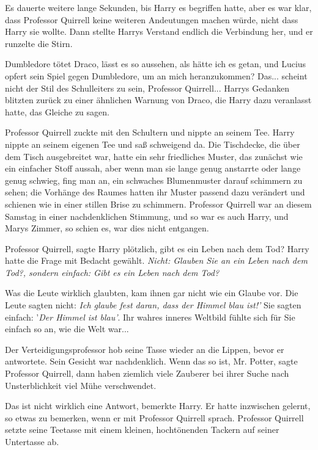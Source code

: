 Es dauerte weitere lange Sekunden, bis Harry es begriffen hatte, aber es war
klar, dass Professor Quirrell keine weiteren Andeutungen machen würde, nicht
dass Harry sie wollte. Dann stellte Harrys Verstand endlich die Verbindung her,
und er runzelte die Stirn.

\glqq{}Dumbledore tötet Draco, lässt es so aussehen, als hätte ich es getan, und
Lucius opfert sein Spiel gegen Dumbledore, um an mich heranzukommen? Das...
scheint nicht der Stil des Schulleiters zu sein, Professor Quirrell...\grqq{}
Harrys Gedanken blitzten zurück zu einer ähnlichen Warnung von Draco, die Harry
dazu veranlasst hatte, das Gleiche zu sagen.

Professor Quirrell zuckte mit den Schultern und nippte an seinem Tee. Harry
nippte an seinem eigenen Tee und saß schweigend da. Die Tischdecke, die über dem
Tisch ausgebreitet war, hatte ein sehr friedliches Muster, das zunächst wie ein
einfacher Stoff aussah, aber wenn man sie lange genug anstarrte oder lange genug
schwieg, fing man an, ein schwaches Blumenmuster darauf schimmern zu sehen; die
Vorhänge des Raumes hatten ihr Muster passend dazu verändert und schienen wie in
einer stillen Brise zu schimmern. Professor Quirrell war an diesem Samstag in
einer nachdenklichen Stimmung, und so war es auch Harry, und Marys Zimmer, so
schien es, war dies nicht entgangen.

\glqq{}Professor Quirrell\grqq{}, sagte Harry plötzlich, \glqq{}gibt es ein Leben
nach dem Tod?\grqq{} Harry hatte die Frage mit Bedacht gewählt. \emph{ Nicht: \glqq{}
Glauben Sie an ein Leben nach dem Tod?\grqq{}, sondern einfach: \glqq{}Gibt es
ein Leben nach dem Tod?}

Was die Leute wirklich glaubten, kam ihnen gar nicht wie ein Glaube vor. Die
Leute sagten nicht: \glqq{}\emph{Ich glaube fest daran, dass der Himmel blau
ist!'} Sie sagten einfach: '\emph{Der Himmel ist blau'}. Ihr wahres inneres
Weltbild fühlte sich für Sie einfach so an, wie die Welt war...

Der Verteidigungsprofessor hob seine Tasse wieder an die Lippen, bevor er
antwortete. Sein Gesicht war nachdenklich. \glqq{}Wenn das so ist, Mr.
Potter\grqq{}, sagte Professor Quirrell, \glqq{}dann haben ziemlich viele
Zauberer bei ihrer Suche nach Unsterblichkeit viel Mühe verschwendet.\grqq{}

\glqq{}Das ist nicht wirklich eine Antwort\grqq{}, bemerkte Harry. Er hatte
inzwischen gelernt, so etwas zu bemerken, wenn er mit Professor Quirrell sprach.
Professor Quirrell setzte seine Teetasse mit einem kleinen, hochtönenden Tackern
auf seiner Untertasse ab.

